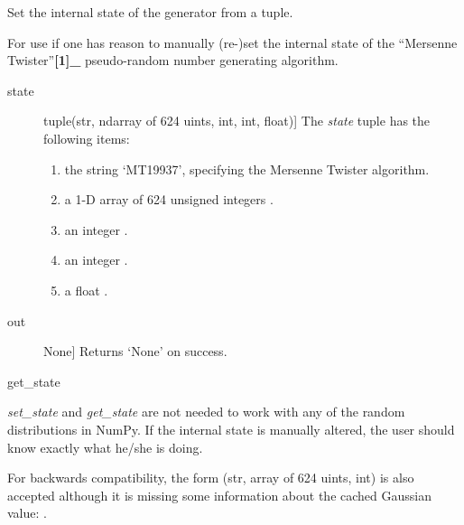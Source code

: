 \documentclass[letterpaper,10pt,english]{sphinxmanual}
\begin{document}
\begin{fulllineitems}
\label{pygeomod:pygeomod.geomodeller_xml_obj.set_state}
Set the internal state of the generator from a tuple.

For use if one has reason to manually (re-)set the internal state of the
``Mersenne Twister''{\color{red}\bfseries{}{[}1{]}\_} pseudo-random number generating algorithm.
\begin{description}
\item[{state}] \leavevmode{[}tuple(str, ndarray of 624 uints, int, int, float){]}
The \emph{state} tuple has the following items:
\begin{enumerate}
\item {} 
the string `MT19937', specifying the Mersenne Twister algorithm.

\item {} 
a 1-D array of 624 unsigned integers .

\item {} 
an integer .

\item {} 
an integer .

\item {} 
a float .

\end{enumerate}

\end{description}
\begin{description}
\item[{out}] \leavevmode{[}None{]}
Returns `None' on success.

\end{description}

get\_state

\emph{set\_state} and \emph{get\_state} are not needed to work with any of the
random distributions in NumPy. If the internal state is manually altered,
the user should know exactly what he/she is doing.

For backwards compatibility, the form (str, array of 624 uints, int) is
also accepted although it is missing some information about the cached
Gaussian value: .

\end{fulllineitems}

\end{document}

